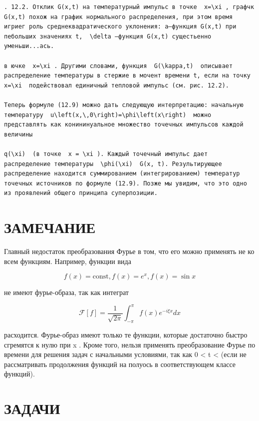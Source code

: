 \documentclass[
  ukrainian,
]{article}
\begin{document}
\begin{verbatim}
. 12.2. Отклик G(x,t) на температурный импульс в точке  x=\xi , графчк G(x,t) похож на график нормального распределения, при этом время игриег роль среднеквадратического уклонения: a—функция G(x,t) при пебольших значениях t,  \delta —функция G(x,t) сущестьенно уменьши...ась.

в ючке  x=\xi . Другими словами, функция  G(\kappa,t)  описывает распределение температуры в стержие в мочент времени t, если на точку  x=\xi  подействовал единичный тепловой импульс (см. рис. 12.2).

Теперь формуле (12.9) можно дать следующую интерпретацию: начальную температуру  u\left(x,\,0\right)=\phi\left(x\right)  можно представлять как конининуальное множество точечных импульсов каждой величины

q(\xi)  (в точке  x = \xi ). Каждый точечный импульс дает распределение температуры  \phi(\xi)  G(x, t). Результирующее распределение находится суммированием (интегрированием) температур точечных источников по формуле (12.9). Позже мы увидим, что это одно из проявлений общего принципа суперпозиции.
\end{verbatim}

\section{ЗАМЕЧАНИЕ}\label{ux437ux430ux43cux435ux447ux430ux43dux438ux435}

Главный недостаток преобразования Фурье в том, что его можно применять
не ко всем функциям. Например, функции вида

\[
f(x) = \text{const},
f(x) = e^x,
f(x) = \sin x
\]

не имеют фурье-образа, так как интеграт

\[
\mathcal{F}[f] = \frac{1}{\sqrt{2\pi}} \int_{-\pi}^{\pi} f(x) e^{-i\xi x} dx
\]

расходится. Фурье-образ имеют только те функции, которые достаточно
быстро сгремятся к нулю при \textbar x\textbar{} \to \infty . Кроме
того, нельзя применять преобразование Фурье по времени для решения задач
с начальными условиями, так как 0 \textless{} t \textless{}
\infty  (если не рассматривать продолжения функций на полуось в
соответствующем классе функций).

\section{ЗАДАЧИ}\label{ux437ux430ux434ux430ux447ux438-1}
\end{document}
